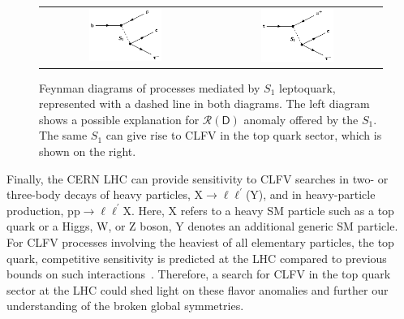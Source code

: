 \begin{figure}[tbh!]
 \begin{center}
 \begin{tabular}{cc}
 \includegraphics[width=0.45\textwidth]{figures/Part1/BSM/S1}&
 \includegraphics[width=0.45\textwidth]{figures/Part1/BSM/S1x}\\
 \end{tabular}
 \caption{Feynman diagrams of processes mediated by $S_1$ leptoquark, represented with a dashed line in both diagrams. The left diagram shows a possible explanation for $\mathcal{R}(\textsf{D})$ anomaly offered by the $S_1$. The same $S_1$ can give rise to \ac{CLFV} in the top quark sector, which is shown on the right.}
 \label{fig:S1}
 \end{center}
\end{figure}

Finally, the \ac{CERN} \ac{LHC} can provide sensitivity to \ac{CLFV} searches in two- or three-body decays of heavy particles, X$\rightarrow\ell\ell^{\prime}$(Y), and in heavy-particle production, pp$\rightarrow\ell\ell^{\prime}$X. Here, X refers to a heavy \ac{SM} particle such as a top quark or a Higgs, W, or Z boson, Y denotes an additional generic \ac{SM} particle. For \ac{CLFV} processes involving the heaviest of all elementary particles, the top quark, competitive sensitivity is predicted at the \ac{LHC} compared to previous bounds on such interactions~\cite{Davidson:2015zza}. Therefore, a search for \ac{CLFV} in the top quark sector at the \ac{LHC} could shed light on these flavor anomalies and further our understanding of the broken global symmetries.